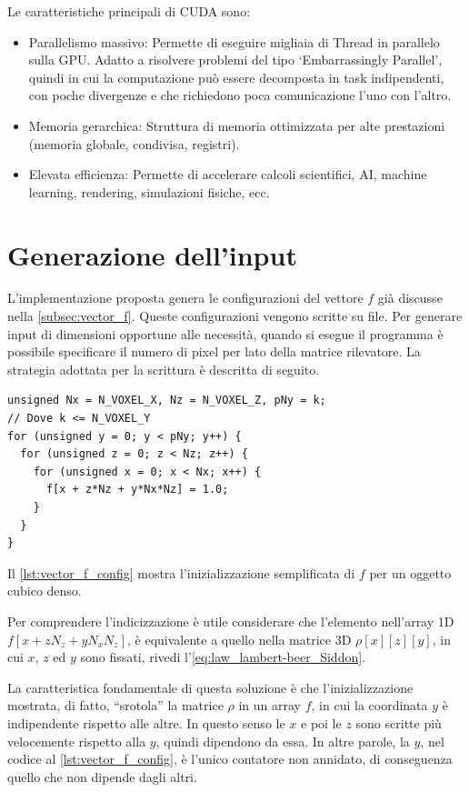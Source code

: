 \documentclass[12pt,a4paper]{report}
\begin{document}
Le caratteristiche principali di CUDA sono:
\begin{itemize}
  \item Parallelismo massivo: Permette di eseguire migliaia di Thread in parallelo sulla GPU. Adatto a risolvere problemi del
        tipo `Embarrassingly Parallel', quindi in cui la computazione può essere decomposta in task indipendenti, con poche
        divergenze e che richiedono poca comunicazione l'uno con l'altro.
  \item Memoria gerarchica: Struttura di memoria ottimizzata per alte prestazioni (memoria globale, condivisa, registri).
  \item Elevata efficienza: Permette di accelerare calcoli scientifici, AI, machine learning, rendering, simulazioni fisiche, ecc.
\end{itemize}

\section{Generazione dell'input}

L'implementazione proposta genera le configurazioni del vettore \(f\) già discusse nella \autoref{subsec:vector_f}.
Queste configurazioni vengono scritte su file.
Per generare input di dimensioni opportune alle necessità, quando si esegue il programma è possibile specificare il numero di
pixel per lato della matrice rilevatore.
La strategia adottata per la scrittura è descritta di seguito.

\begin{lstlisting}[language=CStyle, caption={Codice C per inizializzazione di \(f\) per un cubo.}, label={lst:vector_f_config}]
unsigned Nx = N_VOXEL_X, Nz = N_VOXEL_Z, pNy = k;
// Dove k <= N_VOXEL_Y
for (unsigned y = 0; y < pNy; y++) {
  for (unsigned z = 0; z < Nz; z++) {
    for (unsigned x = 0; x < Nx; x++) {
      f[x + z*Nz + y*Nx*Nz] = 1.0;
    }
  }
}
\end{lstlisting}

Il \autoref{lst:vector_f_config} mostra l'inizializzazione semplificata di \(f\) per un oggetto cubico denso.

Per comprendere l'indicizzazione è utile considerare che l'elemento nell'array 1D \(f[x + z N_z + y N_x N_z]\), è equivalente a
quello nella matrice 3D \(\rho[x][z][y]\), in cui \(x\), \(z\) ed \(y\)  sono fissati, rivedi l'\autoref{eq:law_lambert-beer_Siddon}.

La caratteristica fondamentale di questa soluzione è che l'inizializzazione mostrata, di fatto, ``srotola'' la matrice
\(\rho\) in un array \(f\), in cui la coordinata \(y\) è indipendente rispetto alle altre.
In questo senso le \(x\) e poi le \(z\) sono scritte più velocemente rispetto alla \(y\), quindi dipendono da essa.
In altre parole, la \(y\), nel codice al \autoref{lst:vector_f_config}, è l'unico contatore non annidato, di conseguenza quello
che non dipende dagli altri.
\end{document}
